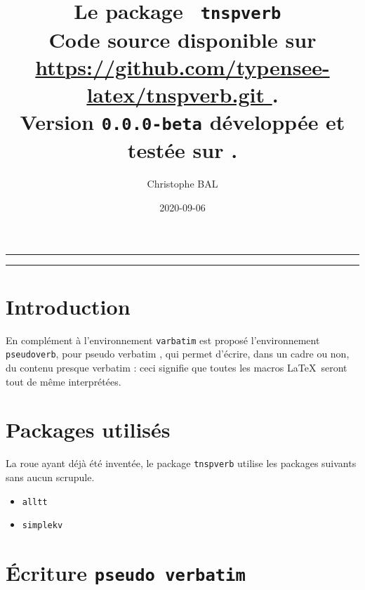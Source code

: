\documentclass[12pt,a4paper]{article}
\theoremstyle{definition}
\newcommand\env[1]{\texttt{#1}}
\begin{document}
\renewcommand\labelitemi{\raisebox{0.125em}{\tiny\textbullet}}
\renewcommand{\labelitemii}{---}

\title{   %
	Le package \texttt{ tnspverb }\\%
	{\footnotesize Code source disponible sur \url{ https://github.com/typensee-latex/tnspverb.git }.}\\%
{\footnotesize Version \texttt{0.0.0-beta} développée et testée sur \macosxname{}.}%
}
\author{Christophe BAL}
\date{2020-09-06}

\maketitle


\vspace{2em}

\hrule

\tableofcontents

\vspace{1.5em}

\hrule

\newpage

\section{Introduction}

En complément à l'environnement \env{varbatim} est proposé l'environnement \env{pseudoverb}, pour \og pseudo verbatim \fg, qui permet d'écrire, dans un cadre ou non, du contenu presque verbatim : ceci signifie que toutes les macros \LaTeX\ seront tout de même interprétées.
\section{Packages utilisés}

La roue ayant déjà été inventée, le package \verb#tnspverb# utilise les packages suivants sans aucun scrupule.

\begin{multicols}{4}
    \begin{itemize}
\item \verb#alltt#
    \item \verb#simplekv#
    \end{itemize}
\end{multicols}
\section{Écriture \texttt{pseudo verbatim}}
\end{document}
